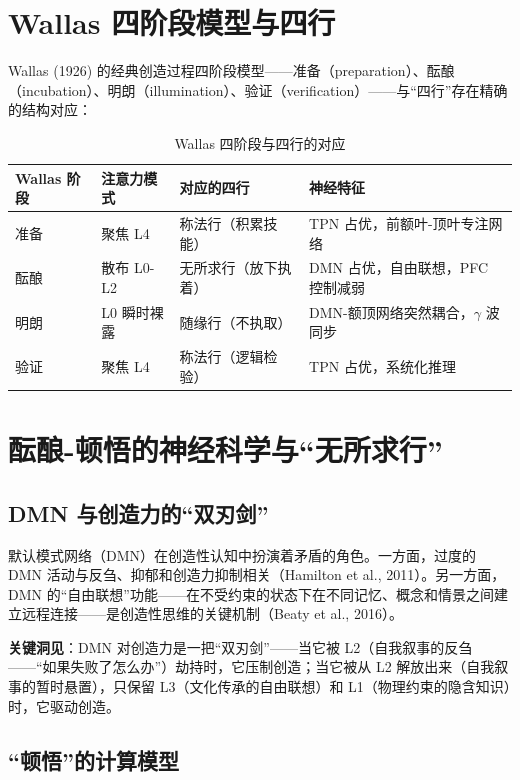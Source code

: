 \documentclass[UTF8,12pt,a4paper]{ctexart}
\begin{document}
\section{Wallas 四阶段模型与四行}

Wallas (1926) 的经典创造过程四阶段模型——准备（preparation）、酝酿（incubation）、明朗（illumination）、验证（verification）——与``四行''存在精确的结构对应：

\begin{table}[h]
\centering
\caption{Wallas 四阶段与四行的对应}
\begin{tabular}{p{2.2cm}p{2.5cm}p{3cm}p{4.5cm}}
\toprule
\textbf{Wallas 阶段} & \textbf{注意力模式} & \textbf{对应的四行} & \textbf{神经特征} \\
\midrule
准备 & 聚焦 L4 & 称法行（积累技能） & TPN 占优，前额叶-顶叶专注网络 \\
酝酿 & 散布 L0-L2 & 无所求行（放下执着） & DMN 占优，自由联想，PFC 控制减弱 \\
明朗 & L0 瞬时裸露 & 随缘行（不执取） & DMN-额顶网络突然耦合，$\gamma$ 波同步 \\
验证 & 聚焦 L4 & 称法行（逻辑检验） & TPN 占优，系统化推理 \\
\bottomrule
\end{tabular}
\end{table}

\section{酝酿-顿悟的神经科学与``无所求行''}

\subsection{DMN 与创造力的``双刃剑''}

默认模式网络（DMN）在创造性认知中扮演着矛盾的角色。一方面，过度的 DMN 活动与反刍、抑郁和创造力抑制相关（Hamilton et al., 2011）。另一方面，DMN 的``自由联想''功能——在不受约束的状态下在不同记忆、概念和情景之间建立远程连接——是创造性思维的关键机制（Beaty et al., 2016）。

\textbf{关键洞见}：DMN 对创造力是一把``双刃剑''——当它被 L2（自我叙事的反刍——``如果失败了怎么办''）劫持时，它压制创造；当它被从 L2 解放出来（自我叙事的暂时悬置），只保留 L3（文化传承的自由联想）和 L1（物理约束的隐含知识）时，它驱动创造。

\subsection{``顿悟''的计算模型}
\end{document}
